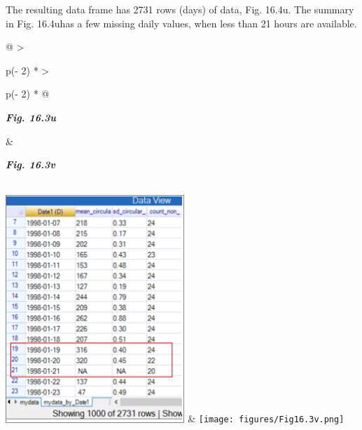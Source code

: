 \documentclass[
  letterpaper,
  DIV=11,
  numbers=noendperiod]{scrreprt}
\begin{document}
The resulting data frame has 2731 rows (days) of data, Fig. 16.4u. The
summary in Fig. 16.4uhas a few missing daily values, when less than 21
hours are available.

\begin{longtable}[]{@{}
  >{\raggedright\arraybackslash}p{(\columnwidth - 2\tabcolsep) * }
  >{\raggedright\arraybackslash}p{(\columnwidth - 2\tabcolsep) * }@{}}
\toprule\noalign{}
\begin{minipage}[b]{\linewidth}\raggedright
\textbf{\emph{Fig. 16.3u}}
\end{minipage} & \begin{minipage}[b]{\linewidth}\raggedright
\textbf{\emph{Fig. 16.3v}}
\end{minipage} \\
\midrule\noalign{}
\endhead
\bottomrule\noalign{}
\endlastfoot
\includegraphics[width=2.6617in,height=3.3775in]{figures/Fig16.3u.png} &
\texttt{[image: figures/Fig16.3v.png]} \\
\end{longtable}
\end{document}
